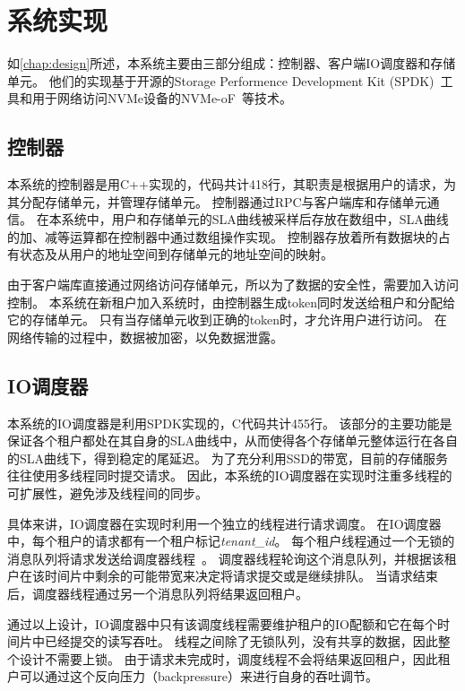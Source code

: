 
\chapter{系统实现}
\label{chap:impl}

如\autoref{chap:design}所述，本系统主要由三部分组成：控制器、客户端IO调度器和存储单元。
他们的实现基于开源的Storage Performence Development Kit (SPDK)~\cite{yang2017spdk}工具和用于网络访问NVMe设备的NVMe-oF~\cite{nvmeof2016}等技术。

\section{控制器}
\label{sec:impl-controller}

本系统的控制器是用C++实现的，代码共计418行，其职责是根据用户的请求，为其分配存储单元，并管理存储单元。
控制器通过RPC与客户端库和存储单元通信。
在本系统中，用户和存储单元的SLA曲线被采样后存放在数组中，SLA曲线的加、减等运算都在控制器中通过数组操作实现。
控制器存放着所有数据块的占有状态及从用户的地址空间到存储单元的地址空间的映射。

由于客户端库直接通过网络访问存储单元，所以为了数据的安全性，需要加入访问控制。
本系统在新租户加入系统时，由控制器生成token同时发送给租户和分配给它的存储单元。
只有当存储单元收到正确的token时，才允许用户进行访问。
在网络传输的过程中，数据被加密，以免数据泄露。

\section{IO调度器}
\label{sec:impl-client}

本系统的IO调度器是利用SPDK实现的，C代码共计455行。
该部分的主要功能是保证各个租户都处在其自身的SLA曲线中，从而使得各个存储单元整体运行在各自的SLA曲线下，得到稳定的尾延迟。
为了充分利用SSD的带宽，目前的存储服务往往使用多线程同时提交请求。
因此，本系统的IO调度器在实现时注重多线程的可扩展性，避免涉及线程间的同步。

具体来讲，IO调度器在实现时利用一个独立的线程进行请求调度。
在IO调度器中，每个租户的请求都有一个租户标记\textit{tenant\_id}。
每个租户线程通过一个无锁的消息队列将请求发送给调度器线程~\cite{dpdkring}。
调度器线程轮询这个消息队列，并根据该租户在该时间片中剩余的可能带宽来决定将请求提交或是继续排队。
当请求结束后，调度器线程通过另一个消息队列将结果返回租户。

通过以上设计，IO调度器中只有该调度线程需要维护租户的IO配额和它在每个时间片中已经提交的读写吞吐。
线程之间除了无锁队列，没有共享的数据，因此整个设计不需要上锁。
由于请求未完成时，调度线程不会将结果返回租户，因此租户可以通过这个反向压力（backpressure）来进行自身的吞吐调节。


